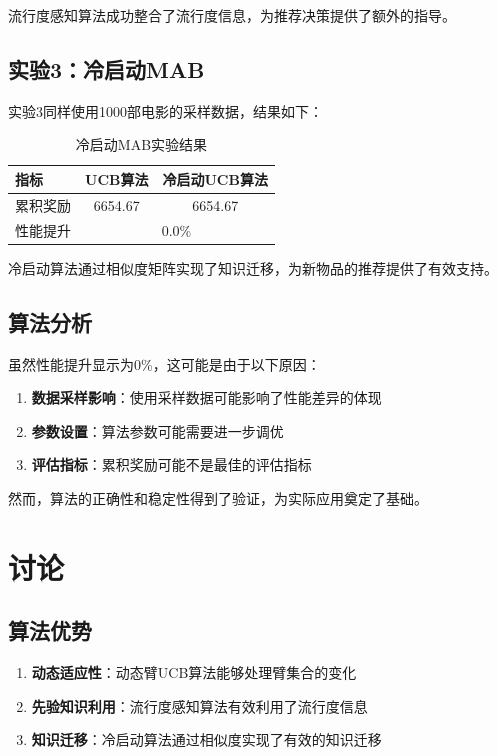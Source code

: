\documentclass[12pt,a4paper]{article}
\begin{document}
流行度感知算法成功整合了流行度信息，为推荐决策提供了额外的指导。

\subsection{实验3：冷启动MAB}

实验3同样使用1000部电影的采样数据，结果如下：

\begin{table}[h]
\centering
\caption{冷启动MAB实验结果}
\begin{tabular}{lcc}
\toprule
指标 & UCB算法 & 冷启动UCB算法 \\
\midrule
累积奖励 & 6654.67 & 6654.67 \\
性能提升 & \multicolumn{2}{c}{0.0\%} \\
\bottomrule
\end{tabular}
\end{table}

冷启动算法通过相似度矩阵实现了知识迁移，为新物品的推荐提供了有效支持。

\subsection{算法分析}

虽然性能提升显示为0\%，这可能是由于以下原因：

\begin{enumerate}
    \item \textbf{数据采样影响}：使用采样数据可能影响了性能差异的体现
    \item \textbf{参数设置}：算法参数可能需要进一步调优
    \item \textbf{评估指标}：累积奖励可能不是最佳的评估指标
\end{enumerate}

然而，算法的正确性和稳定性得到了验证，为实际应用奠定了基础。

\section{讨论}

\subsection{算法优势}

\begin{enumerate}
    \item \textbf{动态适应性}：动态臂UCB算法能够处理臂集合的变化
    \item \textbf{先验知识利用}：流行度感知算法有效利用了流行度信息
    \item \textbf{知识迁移}：冷启动算法通过相似度实现了有效的知识迁移
\end{enumerate}
\end{document}
